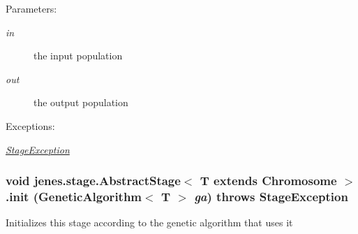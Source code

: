 \begin{Desc}
\item[Parameters:]
\begin{description}
\item[{\em in}]the input population \item[{\em out}]the output population \end{description}
\end{Desc}
\begin{Desc}
\item[Exceptions:]
\begin{description}
\item[{\em \hyperlink{classjenes_1_1stage_1_1_stage_exception}{StageException}}]\end{description}
\end{Desc}
\hypertarget{classjenes_1_1stage_1_1_abstract_stage_3_01_t_01extends_01_chromosome_01_4_f16b278b3f7a6d9fd78e742621b956e5}{
\subsubsection[init]{\setlength{\rightskip}{0pt plus 5cm}void jenes.stage.AbstractStage$<$ T extends Chromosome $>$.init (GeneticAlgorithm$<$ T $>$ {\em ga})  throws {\bf StageException} }}
\label{classjenes_1_1stage_1_1_abstract_stage_3_01_t_01extends_01_chromosome_01_4_f16b278b3f7a6d9fd78e742621b956e5}


Initializes this stage according to the genetic algorithm that uses it

